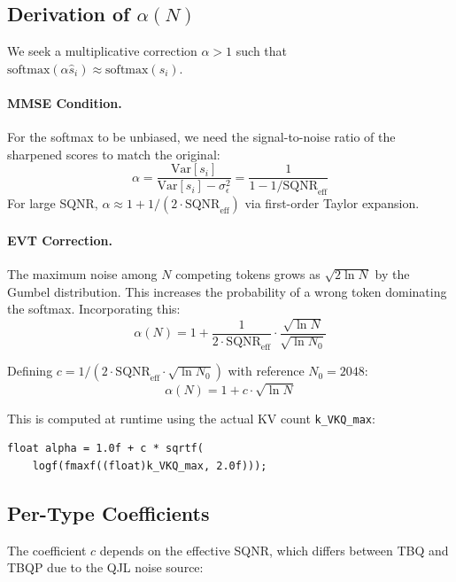 \documentclass[10pt,twocolumn]{article}
\begin{document}
\subsection{Derivation of $\alpha(N)$}

We seek a multiplicative correction $\alpha > 1$ such that $\text{softmax}(\alpha \hat{s}_i) \approx \text{softmax}(s_i)$.

\paragraph{MMSE Condition.} For the softmax to be unbiased, we need the signal-to-noise ratio of the sharpened scores to match the original:
\begin{equation}
\alpha = \frac{\text{Var}[s_i]}{\text{Var}[s_i] - \sigma_\epsilon^2} = \frac{1}{1 - 1/\text{SQNR}_\text{eff}}
\end{equation}
For large SQNR, $\alpha \approx 1 + 1/(2 \cdot \text{SQNR}_\text{eff})$ via first-order Taylor expansion.

\paragraph{EVT Correction.} The maximum noise among $N$ competing tokens grows as $\sqrt{2\ln N}$ by the Gumbel distribution. This increases the probability of a wrong token dominating the softmax. Incorporating this:
\begin{equation}
\alpha(N) = 1 + \frac{1}{2 \cdot \text{SQNR}_\text{eff}} \cdot \frac{\sqrt{\ln N}}{\sqrt{\ln N_0}}
\end{equation}

Defining $c = 1/(2 \cdot \text{SQNR}_\text{eff} \cdot \sqrt{\ln N_0})$ with reference $N_0 = 2048$:
\begin{equation}
\boxed{\alpha(N) = 1 + c \cdot \sqrt{\ln N}}
\label{eq:alpha}
\end{equation}

This is computed at runtime using the actual KV count \texttt{k\_VKQ\_max}:
\begin{verbatim}
float alpha = 1.0f + c * sqrtf(
    logf(fmaxf((float)k_VKQ_max, 2.0f)));
\end{verbatim}

\subsection{Per-Type Coefficients}

The coefficient $c$ depends on the effective SQNR, which differs between TBQ and TBQP due to the QJL noise source:
\end{document}
